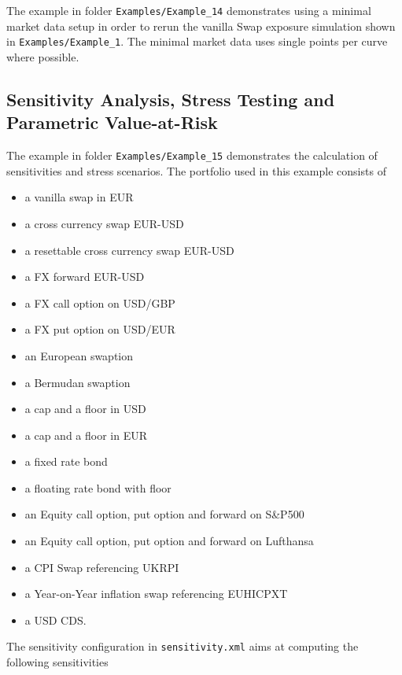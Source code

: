\documentclass[12pt, a4paper]{article}
\begin{document}
{The example in folder {\tt Examples/Example\_14} demonstrates using a minimal market data setup in order to rerun the vanilla Swap exposure simulation shown in {\tt Examples/Example\_1}. The minimal market data uses single points per curve where possible.

\subsection{Sensitivity Analysis, Stress Testing and Parametric Value-at-Risk}\label{ex:sensitivity_stress}

The example in folder {\tt Examples/Example\_15} demonstrates the calculation of sensitivities and stress scenarios. The
portfolio used in this example consists of

\begin{itemize}
\item a vanilla swap in EUR
\item a cross currency swap EUR-USD
\item a resettable cross currency swap EUR-USD
\item a FX forward EUR-USD
\item a FX call option on USD/GBP %
\item a FX put option on USD/EUR
\item an European swaption
\item a Bermudan swaption 
\item a cap and a floor in USD
\item a cap and a floor in EUR
\item a fixed rate bond
\item a floating rate bond with floor
\item an Equity call option, put option and forward on S\&P500
\item an Equity call option, put option and forward on Lufthansa
\item a CPI Swap referencing UKRPI
\item a Year-on-Year inflation swap referencing EUHICPXT
\item a USD CDS.
\end{itemize}

The sensitivity configuration in {\tt sensitivity.xml} aims at computing the following sensitivities

}
\end{document}
